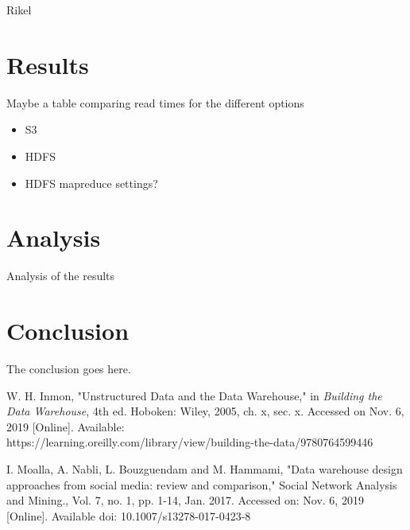 \documentclass[journal]{IEEEtran}
\begin{document}
Rikel

\section{Results}



Maybe a table comparing read times for the different options

\begin{itemize}
	\item S3
	\item HDFS
	\item HDFS mapreduce settings?
\end{itemize}

\section{Analysis}

Analysis of the results


\section{Conclusion}

The conclusion goes here.

\ifCLASSOPTIONcaptionsoff
  \newpage
\fi

\begin{thebibliography}{1}

W. H. Inmon, "Unstructured Data and the Data Warehouse," in 
  \emph{Building the Data Warehouse},
  4th ed. Hoboken: Wiley, 2005, ch. x, sec. x.
  Accessed on Nov. 6, 2019 [Online]. 
  Available: \\ https://learning.oreilly.com/library/view/building-the-data/9780764599446

I. Moalla, A. Nabli, L. Bouzguendam and M. Hammami,
 "Data warehouse design approaches from social media: review and comparison,"
 Social Network Analysis and Mining., Vol. 7, no. 1, pp. 1-14, Jan. 2017.
 Accessed on: Nov. 6, 2019 [Online]. Available doi: 10.1007/s13278-017-0423-8

\end{thebibliography}


\end{document}
